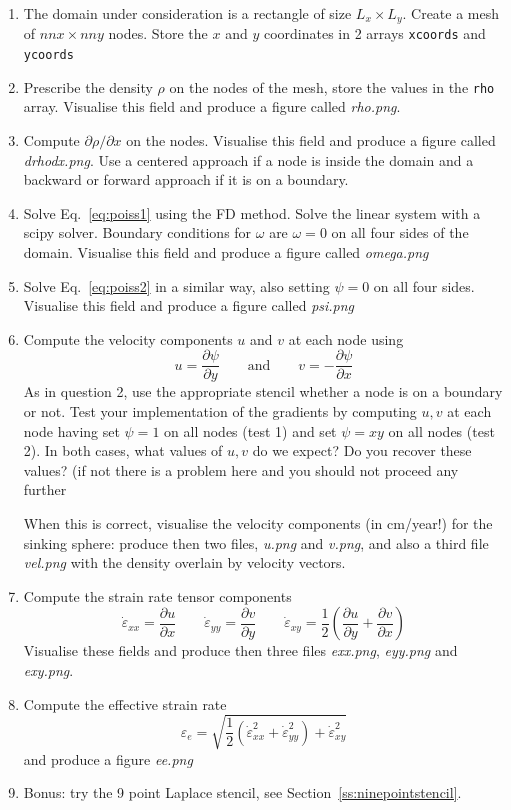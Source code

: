 \begin{enumerate}
\item The domain under consideration is a rectangle of size $L_x \times L_y$. Create a mesh of $nnx \times nny$ nodes. 
Store the $x$ and $y$ coordinates in 2 arrays {\tt xcoords} and {\tt ycoords}
\item Prescribe the density $\rho$ on the nodes of the mesh, store the values in the {\tt rho} array. 
Visualise this field and produce a figure called {\sl rho.png}.
\item Compute $\partial \rho/ \partial x$ on the nodes. Visualise this field and produce a figure called {\sl drhodx.png}. 
Use a centered approach if a node is inside the domain and a backward or forward approach if it is on a boundary.
\item Solve Eq.~\eqref{eq:poiss1} using the FD method. Solve the linear system with a scipy solver. Boundary conditions for $\omega$ are $\omega=0$ on all four sides of the domain.
Visualise this field and produce a figure called {\sl omega.png}
\item Solve Eq.~\eqref{eq:poiss2} in a similar way, also setting $\psi=0$ on all four sides.
Visualise this field and produce a figure called {\sl psi.png}
\item Compute the velocity components $u$ and $v$ at each node using 
\[
u=\frac{\partial \psi}{\partial y} 
\qquad \text{and} \qquad
v=-\frac{\partial \psi}{\partial x} 
\]
As in question 2, use the appropriate stencil whether a node is on a boundary or not.
Test your implementation of the gradients by computing $u,v$ at each node having set $\psi=1$ on all nodes
(test 1) and set $\psi=xy$ on all nodes (test 2). In both cases, what values of $u,v$ do we expect? 
Do you recover these values? (if not there is a problem here and you should not proceed any further 

When this is correct, visualise the velocity components (in cm/year!) for the sinking sphere: produce then 
two files, {\sl u.png} and {\sl v.png}, and also a third file {\sl vel.png} 
with the density overlain by velocity vectors. 

\item Compute the strain rate tensor components
\[
\dot\varepsilon_{xx} =\frac{\partial u}{\partial x} 
\qquad
\dot\varepsilon_{yy} =\frac{\partial v}{\partial y} 
\qquad
\dot\varepsilon_{xy} = \frac12 \left(\frac{\partial u}{\partial y} + \frac{\partial v}{\partial x} \right)
\]
Visualise these fields and produce then three files {\sl exx.png}, {\sl eyy.png} and {\sl exy.png}.

\item Compute the effective strain rate
\[
\varepsilon_e = \sqrt{ \frac{1}{2}(\dot\varepsilon_{xx}^2 + \dot\varepsilon_{yy}^2 ) + \dot\varepsilon_{xy}^2  }
\]
and produce a figure {\sl ee.png}

\item Bonus: try the 9 point Laplace stencil, see Section~\ref{ss:ninepointstencil}.

\end{enumerate}


